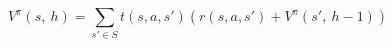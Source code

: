 \documentclass[preview,30pt]{standalone}
\begin{document}
$$
V^\pi(s,\ h)= \sum_{s'\in S} t(s,a,s') \left( r(s, a, s') + V^\pi(s',\ h-1) \right)
$$
\end{document}

